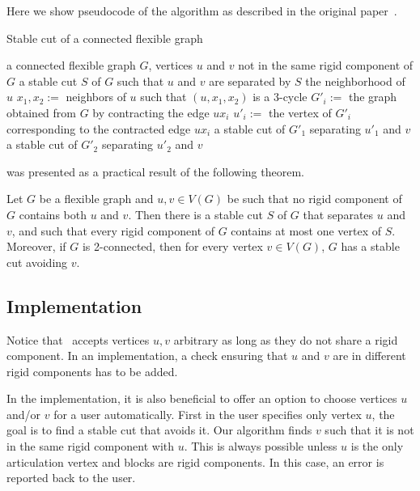 Here we show pseudocode of the algorithm as described
in the original paper~\cite{stable_cuts_legersky}.
%
\begin{algorithm}[ht]
	\caption{Stable cut of a connected flexible graph}%
	\label{alg:stable_cut_flexible}%
	\begin{algorithmic}[1]
		\Require{} a connected flexible graph $G$, vertices $u$ and $v$ not in the same rigid component of $G$
		\Ensure{} a stable cut $S$ of $G$ such that $u$ and $v$ are separated by $S$
		\State\Return{} the neighborhood of $u$
		\Else{}
		\State{} $x_1,x_2 :={}$ neighbors of $u$ such that $(u,x_1,x_2)$  is a $3$-cycle
		\State{} $G'_i :={}$ the graph obtained from $G$ by contracting the edge $ux_i$
		\State{} $u'_i :={}$ the vertex of $G'_i$ corresponding to the contracted edge $ux_i$
		\EndFor{}
		\State\Return{} a stable cut of $G'_1$ separating $u'_1$ and $v$
		\Else{}
		\State\Return{} a stable cut of $G'_2$ separating $u'_2$ and $v$
		\EndIf{}
		\EndIf{}
	\end{algorithmic}
\end{algorithm}
%

was presented as a practical result of the following theorem.
%
\begin{theorem}
	Let \( G \) be a flexible graph and \( u, v \in V (G) \) be such that no rigid component of \( G \)
	contains both \( u \) and \( v \). Then there is a stable cut \( S \) of \( G \) that separates \( u \) and \( v \), and such that
	every rigid component of \( G \) contains at most one vertex of \( S \). Moreover, if \( G \) is 2-connected,
	then for every vertex \( v \in V(G) \), \( G \) has a stable cut avoiding \( v \).
\end{theorem}
%

\subsection{Implementation}%
\label{sec:stable_cuts_implementation}

Notice that~
accepts vertices \( u, v \) arbitrary as long as they do not share a rigid component.
In an implementation, a check ensuring that \( u \) and \( v \)
are in different rigid components has to be added.

In the implementation, it is also beneficial to offer an option to choose
vertices \( u \) and/or \(  v \) for a user automatically.
First in the user specifies only vertex \( u \), the goal is to find a stable cut
that avoids it. Our algorithm finds \( v \)
such that it is not in the same rigid component with \( u \).
This is always possible unless \( u \) is the only articulation vertex
and blocks are rigid components. In this case, an error is reported back to the user.

